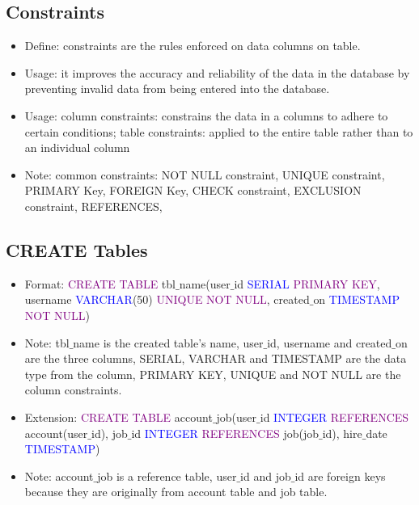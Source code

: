 \documentclass[a4paper]{article}
\begin{document}
\subsection{Constraints}
\begin{itemize}
  \item Define: constraints are the rules enforced on data columns on table. 
  \item Usage: it improves the accuracy and reliability of the data in the database by preventing invalid data from being entered into the database.
  \item Usage: column constraints: constrains the data in a columns to adhere to certain conditions; table constraints: applied to the entire table rather than to an individual column
  \item Note: common constraints: NOT NULL constraint, UNIQUE constraint, PRIMARY Key, FOREIGN Key, CHECK constraint, EXCLUSION constraint, REFERENCES, 
\end{itemize}

\subsection{CREATE Tables}
\begin{itemize}
  \item Format: \textcolor{purple}{CREATE TABLE} tbl$\_$name(user$\_$id \textcolor{blue}{SERIAL} \textcolor{purple}{PRIMARY KEY}, username \textcolor{blue}{VARCHAR}(50) \textcolor{purple}{UNIQUE NOT NULL}, created$\_$on \textcolor{blue}{TIMESTAMP} \textcolor{purple}{NOT NULL})
  \item Note: tbl$\_$name is the created table's name, user$\_$id, username and created$\_$on are the three columns, SERIAL, VARCHAR and TIMESTAMP are the data type from the column, PRIMARY KEY, UNIQUE and NOT NULL are the column constraints. 
  \item Extension: \textcolor{purple}{CREATE TABLE} account$\_$job(user$\_$id \textcolor{blue}{INTEGER} \textcolor{purple}{REFERENCES} account(user$\_$id), job$\_$id \textcolor{blue}{INTEGER} \textcolor{purple}{REFERENCES} job(job$\_$id), hire$\_$date \textcolor{blue}{TIMESTAMP})
  \item Note: account$\_$job is a reference table, user$\_$id and job$\_$id are foreign keys because they are originally from account table and job table. 
\end{itemize}
\end{document}
